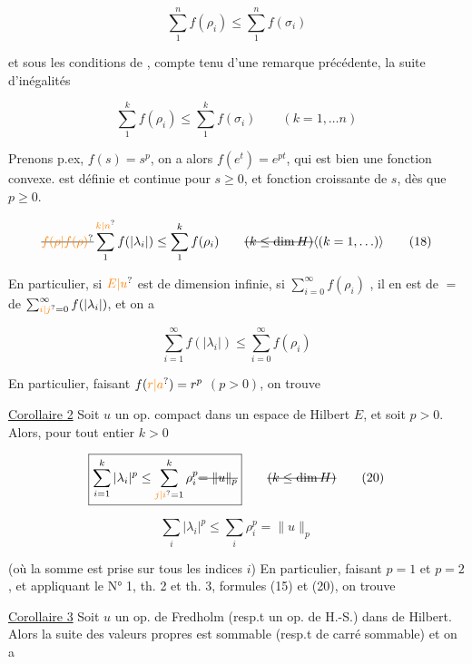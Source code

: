 \[
\sum_1^n f(\rho_i)\leq\sum_1^n f(\sigma_i)\tag*{(13)}
\]

et sous les conditions de , compte tenu d'une remarque précédente, la suite d'inégalités

\[
\sum_1^k f(\rho_i)\leq\sum_1^k f(\sigma_i)\qquad(k=1,\ldots n)\tag*{(14)}
\]

Prenons p.ex,  $f(s)=s^p$,  on a alors $f(e^t)=e^{pt}$, qui est bien une fonction convexe.  est définie et  continue pour $s\geq0$, et  fonction croissante de $s$, dès que $p\geq0$. 


\[
\deleted{\unsure{f(\rho|f(\rho)}}\sum_1^{\unsure{k|n}}f(|\lambda_i|)\leq\sum_1^k f(\rho_i)\qquad\deleted{(k\leq\dim H)}\inserted{(k=1,\ldots)}\tag*{(18)}
\]

En particulier,  si \deleted{\unsure{$\dim$}} $\unsure{E|u}$ est de dimension infinie, si  $\sum_{i=0}^{\infty}f(\rho_i)$ , il en est de $=$ de $\sum_{\unsure{i|j}=0}^{\infty}f(|\lambda_i|)$, et on a

\[
\sum_{i=1}^{\infty}f(|\lambda_i|)\leq\sum_{i=0}^{\infty}f(\rho_i)\tag*{(19)}
\]

En particulier, faisant $f(\unsure{r|a})=r^p$ $(p>0)$, on trouve

\uline{Corollaire 2} Soit $u$ un op. compact dans un espace de Hilbert $E$, et soit $p>0$. Alors, pour tout entier $k>0$

\[
\boxed{\sum_{i=1}^k|\lambda_i|^p\leq\sum_{\unsure{j|i}=1}^k\rho_i^p\deleted{=\|u\|_p}}\qquad\deleted{(k\leq\dim H)}\tag*{(20)}
\]


\[
\boxed{\sum_i|\lambda_i|^p\leq\sum_i\rho_i^p=\|u\|_p}\tag*{(21)}
\]

(où la somme est prise sur tous les indices $i$) En particulier, faisant $p=1$ et $p=2$, et appliquant le N° 1, th. 2 et th. 3, formules (15) et (20), on trouve

\uline{Corollaire 3} Soit $u$ un op.  de Fredholm (resp.t un op. de  H.-S.) dans  de Hilbert.  Alors  la suite des valeurs propres est sommable (resp.t de carré sommable) et on a

